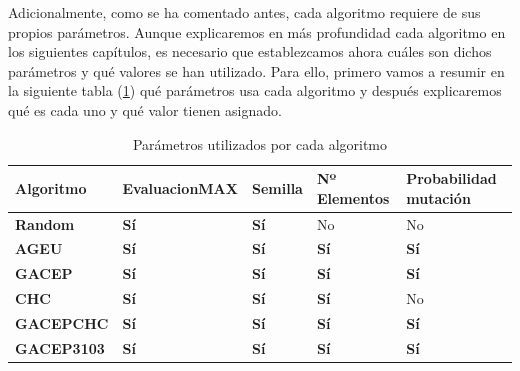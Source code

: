 \newpage
\newpage
\newpage
\newpage
Adicionalmente, como se ha comentado antes, cada algoritmo requiere de sus propios parámetros. 
Aunque explicaremos en más profundidad cada algoritmo en los siguientes capítulos, es necesario que establezcamos ahora cuáles son dichos parámetros y qué valores se han utilizado. 
Para ello, primero vamos a resumir en la siguiente tabla (\ref{table:Parametros}) qué parámetros usa cada algoritmo y después explicaremos qué es cada uno y qué valor tienen asignado.

\begin{table}[H]
\label{table:Parametros}
\caption{Parámetros utilizados por cada algoritmo}
\begin{tabular}{|l|l|l|l|l|}
\hline
\rowcolor[HTML]{F7EAC7} 
Algoritmo          & EvaluacionMAX & Semilla     & Nº Elementos & Probabilidad mutación \\ \hline
\rowcolor[HTML]{DAE8FC} 
\textbf{Random}    & \textbf{Sí}   & \textbf{Sí} & No           & No                    \\ \hline
\rowcolor[HTML]{DDFDFF} 
\textbf{AGEU}      & \textbf{Sí}   & \textbf{Sí} & \textbf{Sí}  & \textbf{Sí}           \\ \hline
\rowcolor[HTML]{DAE8FC} 
\textbf{GACEP}     & \textbf{Sí}   & \textbf{Sí} & \textbf{Sí}  & \textbf{Sí}           \\ \hline
\rowcolor[HTML]{DDFDFF} 
\textbf{CHC}       & \textbf{Sí}   & \textbf{Sí} & \textbf{Sí}  & No                    \\ \hline
\rowcolor[HTML]{DAE8FC} 
\textbf{GACEPCHC}  & \textbf{Sí}   & \textbf{Sí} & \textbf{Sí}  & \textbf{Sí}           \\ \hline
\rowcolor[HTML]{DDFDFF} 
\textbf{GACEP3103} & \textbf{Sí}   & \textbf{Sí} & \textbf{Sí}  & \textbf{Sí}           \\ \hline
\end{tabular}
\end{table}

